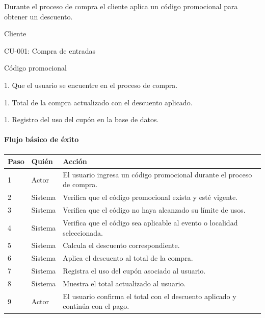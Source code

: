 \begin{description}[leftmargin=!, labelwidth=3.4cm, style=nextline, topsep=3pt]
\item[Objetivo] Durante el proceso de compra el cliente aplica un código promocional para obtener un descuento.

\item[Actores] Cliente

\item[CU relacionados] CU-001: Compra de entradas

\item[Entradas] Código promocional

\item[Pre-condiciones] 1. Que el usuario se encuentre en el proceso de compra.

\item[Salidas] 1. Total de la compra actualizado con el descuento aplicado.

\item[Post-condiciones] 1. Registro del uso del cupón en la base de datos.

\end{description}

\paragraph{Flujo básico de éxito}
\begin{longtable}{P{1.1cm}P{1.8cm}P{10.5cm}}
\toprule
\textbf{Paso} & \textbf{Quién} & \textbf{Acción}\\
\midrule
{} & Actor & El usuario ingresa un código promocional durante el proceso de compra.\\
2 & Sistema & Verifica que el código promocional exista y esté vigente.\\
3 & Sistema & Verifica que el código no haya alcanzado su límite de usos.\\
4 & Sistema & Verifica que el código sea aplicable al evento o localidad seleccionada.\\
5 & Sistema & Calcula el descuento correspondiente.\\
6 & Sistema & Aplica el descuento al total de la compra.\\
7 & Sistema & Registra el uso del cupón asociado al usuario.\\
8 & Sistema & Muestra el total actualizado al usuario.\\
9 & Actor & El usuario confirma el total con el descuento aplicado y continúa con el pago.\\
\bottomrule
\end{longtable}

